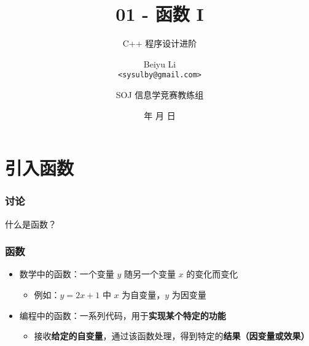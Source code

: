 \title[01 - 函数 I]
{01 - 函数 I}

\subtitle{C++ 程序设计进阶}

\author[Beiyu Li]
{Beiyu Li\\
\texttt{<sysulby@gmail.com>}}


\date[\today]
{\number\year 年 \number\month 月 \number\day 日}




\author[sysulby]
{SOJ 信息学竞赛教练组}

\begin{frame}
    \titlepage
\end{frame}
\setcounter{framenumber}{0} %

\section{引入函数}

\begin{frame}[fragile]
    \frametitle{讨论}

    \begin{block}{}
        \vspace{.5cm}
        \begin{center}
            {\Large 什么是函数？}
        \end{center}
        \vspace{.5cm}
    \end{block}
\end{frame}

\begin{frame}[fragile]
    \frametitle{函数}

    \begin{itemize}
        \item<1-> 数学中的函数：一个变量 $y$ 随另一个变量 $x$ 的变化而变化
        \begin{itemize}
            \item<1-> 例如：$y = 2x + 1$ 中 $x$ 为自变量，$y$ 为因变量
        \end{itemize}
        \item<2-> 编程中的函数：一系列代码，用于\textbf{实现某个特定的功能}
        \begin{itemize}
            \item<2-> 接收\textbf{给定的自变量}，通过该函数处理，得到特定的\textbf{结果（因变量或效果）}
        \end{itemize}
    \end{itemize}
\end{frame}

